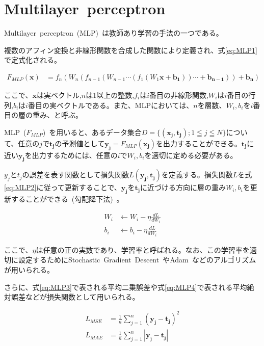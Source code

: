 \section{Multilayer~perceptron}

Multilayer~perceptron~(MLP)~は教師あり学習の手法の一つである。

複数のアフィン変換と非線形関数を合成した関数により定義され、式\ref{eq:MLP1}で定式化される。

\begin{align}
    \label{eq:MLP1}
    F_{MLP}(\boldsymbol{x})&=f_{n}(W_{n}(f_{n-1}(W_{n-1}\cdots(f_{1}(W_{1}\boldsymbol{x}+\boldsymbol{b_{1}}))\cdots+\boldsymbol{b_{n-1}}))+\boldsymbol{b_{n}})
\end{align}

ここで、$\boldsymbol{x}$は実ベクトル,$n$は1以上の整数,$f_{i}$は$i$番目の非線形関数,$W_{i}$は$i$番目の行列,$b_{i}$は$i$番目の実ベクトルである。また、MLPにおいては、$n$を層数、$W_i,b_i$を$i$番目の層の重み、と呼ぶ。

MLP~($F_{MLP}$)~を用いると、あるデータ集合$D=\{(\boldsymbol{x_j},\boldsymbol{t_j}); 1 \leqq j \leqq N\}$について、任意の$j$で$\boldsymbol{t_{j}}$の予測値として$\boldsymbol{y_j}=F_{MLP}(\boldsymbol{x_j})$を出力することができる。$\boldsymbol{t_j}$に近い$\boldsymbol{y_j}$を出力するためには、任意の$i$で$W_i,b_i$を適切に定める必要がある。

$y_j$と$t_j$の誤差を表す関数として損失関数$L(\boldsymbol{y_j},\boldsymbol{t_j})$を定義する。損失関数$L$を式\ref{eq:MLP2}に従って更新することで、$\boldsymbol{y_j}$を$\boldsymbol{t_j}$に近づける方向に層の重み$W_i,b_i$を更新することができる~(勾配降下法)~。

\begin{align}
    \label{eq:MLP2}
    W _i &\leftarrow W_i - \eta \frac{d L}{dW_i} \\
    b _i &\leftarrow b_i - \eta \frac{d L}{dW_i}
\end{align}

ここで、$\eta$は任意の正の実数であり、学習率と呼ばれる。なお、この学習率を適切に設定するためにStochastic~Gradient~Descent~\cite{SGD}やAdam~\cite{Adam}などのアルゴリズムが用いられる。

さらに、式\ref{eq:MLP3}で表される平均二乗誤差や式\ref{eq:MLP4}で表される平均絶対誤差などが損失関数として用いられる。

\begin{align}
    \label{eq:MLP3}
    L_{MSE}&=\frac{1}{n}\sum _{j=1} ^{n} {(\boldsymbol{y_j} - \boldsymbol{t_j})^2}\\
    \label{eq:MLP4}
    L_{MAE}&=\frac{1}{n}\sum _{j=1} ^{n} {|\boldsymbol{y_j} - \boldsymbol{t_j}|}
\end{align}

